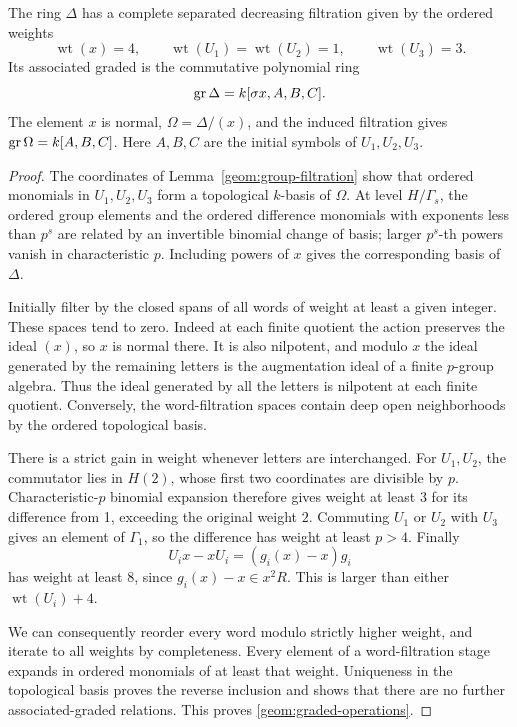 \begin{proposition}\label{geom:skew-filtration}
The ring $\Delta$ has a complete separated decreasing filtration
given by the ordered weights
\[
 \operatorname{wt}(x)=4,\qquad
 \operatorname{wt}(U_1)=\operatorname{wt}(U_2)=1,\qquad
 \operatorname{wt}(U_3)=3.
\]
Its associated graded is the commutative polynomial ring
\begin{equation}\label{geom:graded-operations}
 \operatorname{gr}\Delta=k[\sigma x,A,B,C].
\end{equation}
The element $x$ is normal, $\Omega=\Delta/(x)$, and the induced
filtration gives $\operatorname{gr}\Omega=k[A,B,C]$.  Here $A,B,C$ are the initial
symbols of $U_1,U_2,U_3$.
\end{proposition}

\begin{proof}
The coordinates of Lemma~\ref{geom:group-filtration} show that
ordered monomials in $U_1,U_2,U_3$ form a topological $k$-basis of
$\Omega$.  At level $H/\Gamma_s$, the ordered group elements and
the ordered difference monomials with exponents less than $p^s$
are related by an invertible binomial change of basis; larger
$p^s$-th powers vanish in characteristic $p$.  Including powers of
$x$ gives the corresponding basis of $\Delta$.

Initially filter by the closed spans of all words of weight at
least a given integer.  These spaces tend to zero.  Indeed at each
finite quotient the action preserves the ideal $(x)$, so $x$ is normal
there.  It is also nilpotent, and modulo $x$ the ideal generated by
the remaining letters is the augmentation ideal of a finite
$p$-group algebra.  Thus the ideal generated by all the letters is
nilpotent at each finite quotient.  Conversely, the
word-filtration spaces contain deep open neighborhoods by the
ordered topological basis.

There is a strict gain in weight whenever letters are interchanged.
For $U_1,U_2$, the commutator lies in $H(2)$, whose first two
coordinates are divisible by $p$.  Characteristic-$p$ binomial
expansion therefore gives weight at least $3$ for its difference
from 1, exceeding the original weight $2$.  Commuting $U_1$ or
$U_2$ with $U_3$ gives an element of $\Gamma_1$, so the difference
has weight at least $p>4$.  Finally
\[
 U_i x-xU_i=(g_i(x)-x)g_i
\]
has weight at least $8$, since $g_i(x)-x\in x^2R$.  This is larger
than either $\operatorname{wt}(U_i)+4$.

We can consequently reorder every word modulo strictly higher
weight, and iterate to all weights by completeness.  Every element
of a word-filtration stage expands in ordered monomials of at least
that weight.  Uniqueness in the topological basis proves the reverse
inclusion and shows that there are no further associated-graded
relations.  This proves \eqref{geom:graded-operations}.


\end{proof}
